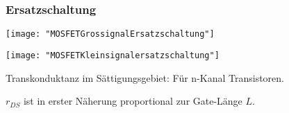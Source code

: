 \subsubsection{Ersatzschaltung}
\begin{minipage}[t]{0.3\textwidth}
	\vspace{0pt}								%
	\texttt{[image: "MOSFETGrossignalErsatzschaltung"]}
\end{minipage}\hspace{0.05\textwidth}
\begin{minipage}[t]{0.65\textwidth}
	\vspace{0pt}								%
	
\end{minipage}
\vspace{2mm}

\begin{minipage}[t]{0.3\textwidth}
	\vspace{0pt}								%
	\texttt{[image: "MOSFETKleinsignalersatzschaltung"]}
\end{minipage}\hspace{0.05\textwidth}
\begin{minipage}[t]{0.65\textwidth}
	\vspace{0pt}								%
	Transkonduktanz im Sättigungsgebiet:
	 Für n-Kanal Transistoren.
	
	$r_{DS}$ ist in erster Näherung proportional zur Gate-Länge $L$.
\end{minipage}
\vspace{2mm}





